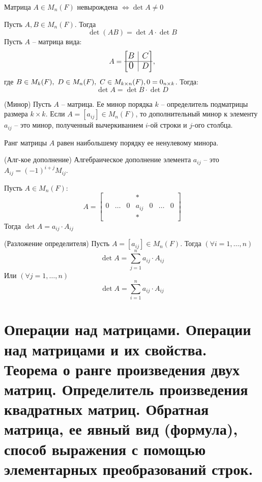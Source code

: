 \begin{multicols}{2}
\begin{note}{}{}
    Матрица $A \in M_n(F)$ невырождена $\Longleftrightarrow \det A \neq 0$
\end{note}
Пусть $A, B \in M_n(F)$. Тогда 
\[
    \det (AB) = \det A\cdot \det B
    \]
Пусть $A$ -- матрица вида:
\[
    A = \mathlarger{\begin{bmatrix}
        B & \rvline & C\\
        \hline \bigzero & \rvline & D
    \end{bmatrix}},
    \]
где $B\in M_{k}(F), \ D\in M_n(F), \ C \in M_{k\times n}(F), \mathlarger{0} = 0_{n\times k}$. Тогда:
\[
    \det A = \det B \cdot \det D
    \]
\begin{definition}{(Минор)}{}
    Пусть $A$ -- матрица. Ее минор порядка $k$ -- определитель подматрицы размера $k\times k$.
    Если $A = [a_{ij}] \in M_n(F)$, то дополнительный минор к элементу $a_{ij}$ -- это минор, полученный вычеркиванием $i$-ой строки и $j$-ого столбца.
\end{definition}
\begin{note}{}{}
    Ранг матрицы $A$ равен наибольшему порядку ее ненулевому минора.
\end{note}
\begin{definition}{(Алг-кое дополнение)}{}
    Алгебраическое дополнение элемента $a_{ij}$ -- это $A_{ij} = (-1)^{i+j}M_{ij}.$
\end{definition}
\begin{lemma}{}{}
    Пусть $A \in M_n(F)$:
    \[
        A = \begin{bmatrix}
            & & & * & & &\\
            0 & \ldots & 0 & a_{ij} & 0 & \ldots & 0\\
            & & & * & & &
        \end{bmatrix}
        \]
        Тогда $\det A = a_{ij} \cdot A_{ij}$
\end{lemma}
\begin{theorema}{(Разложение определителя)}{}
    Пусть $A = [a_{ij}] \in M_{n} (F)$. Тогда $(\forall i = 1, \ldots, n)$
    \[
        \det A = \sum\limits_{j=1}^n a_{ij}\cdot A_{ij}
        \]
    Или $(\forall j = 1,\ldots, n)$
    \[
        \det A = \sum\limits_{i=1}^n a_{ij}\cdot A_{ij}
        \]
\end{theorema}
\section{Операции над матрицами. Операции над матрицами и их свойства. Теорема о ранге
произведения двух матриц. Определитель произведения квадратных матриц. Обратная
матрица, ее явный вид (формула), способ выражения с помощью элементарных
преобразований строк.}

\end{multicols}
